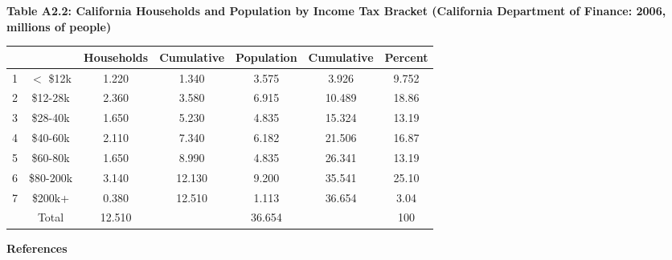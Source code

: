 \documentclass[12pt]{article}
\begin{document}
\begin{center}
\begin{small}
\textbf{Table A2.2: California Households and Population by Income Tax Bracket (California Department of Finance: 2006, millions of people)}\\[10pt]
\begin{tabular}{|c|c|c|c|c|c|c|}
\hline & & Households & Cumulative & Population & Cumulative & Percent \\
\hline 1 &  $<$ \$12k & 1.220 & 1.340 & 3.575 & 3.926 & 9.752 \\
\hline 2 & \$12-28k & 2.360 & 3.580 & 6.915 & 10.489 & 18.86 \\
\hline 3 & \$28-40k & 1.650 & 5.230 & 4.835 & 15.324 & 13.19 \\
\hline 4 & \$40-60k & 2.110 & 7.340 & 6.182 & 21.506 & 16.87 \\
\hline 5 & \$60-80k & 1.650 & 8.990 & 4.835 & 26.341 & 13.19 \\
\hline 6 & \$80-200k & 3.140 & 12.130 & 9.200 & 35.541 & 25.10 \\
\hline 7 & \$200k+ & 0.380 & 12.510 & 1.113 & 36.654 & 3.04 \\
\hline & Total & 12.510 & & 36.654 & & 100 \\
\hline
\end{tabular}
\end{small}
\end{center}

\newpage

\textbf{References}\\[20pt]
\end{document}
